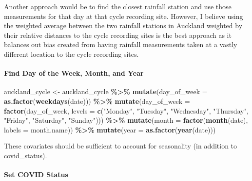 \documentclass[
]{article}
\newenvironment{Shaded}{\begin{snugshade}}{\end{snugshade}}
\newcommand{\AttributeTok}[1]{\textcolor[rgb]{0.13,0.29,0.53}{#1}}
\newcommand{\FunctionTok}[1]{\textcolor[rgb]{0.13,0.29,0.53}{\textbf{#1}}}
\newcommand{\NormalTok}[1]{#1}
\newcommand{\OtherTok}[1]{\textcolor[rgb]{0.56,0.35,0.01}{#1}}
\newcommand{\SpecialCharTok}[1]{\textcolor[rgb]{0.81,0.36,0.00}{\textbf{#1}}}
\newcommand{\StringTok}[1]{\textcolor[rgb]{0.31,0.60,0.02}{#1}}
\begin{document}
Another approach would be to find the closest rainfall station and use
those measurements for that day at that cycle recording site. However, I
believe using the weighted average between the two rainfall stations in
Auckland weighted by their relative distances to the cycle recording
sites is the best approach as it balances out bias created from having
rainfall measurements taken at a vastly different location to the cycle
recording sites.

\hypertarget{find-day-of-the-week-month-and-year}{%
\paragraph{Find Day of the Week, Month, and
Year}\label{find-day-of-the-week-month-and-year}}

\begin{Shaded}
\begin{Highlighting}[]
\NormalTok{auckland\_cycle }\OtherTok{\textless{}{-}}\NormalTok{ auckland\_cycle }\SpecialCharTok{\%\textgreater{}\%}
  \FunctionTok{mutate}\NormalTok{(}\AttributeTok{day\_of\_week =} \FunctionTok{as.factor}\NormalTok{(}\FunctionTok{weekdays}\NormalTok{(date))) }\SpecialCharTok{\%\textgreater{}\%}
  \FunctionTok{mutate}\NormalTok{(}\AttributeTok{day\_of\_week =} \FunctionTok{factor}\NormalTok{(day\_of\_week, }
                              \AttributeTok{levels =} \FunctionTok{c}\NormalTok{(}\StringTok{"Monday"}\NormalTok{, }\StringTok{"Tuesday"}\NormalTok{, }\StringTok{"Wednesday"}\NormalTok{, }\StringTok{"Thursday"}\NormalTok{, }\StringTok{"Friday"}\NormalTok{, }\StringTok{"Saturday"}\NormalTok{, }\StringTok{"Sunday"}\NormalTok{))) }\SpecialCharTok{\%\textgreater{}\%}
  \FunctionTok{mutate}\NormalTok{(}\AttributeTok{month =} \FunctionTok{factor}\NormalTok{(}\FunctionTok{month}\NormalTok{(date), }\AttributeTok{labels =}\NormalTok{ month.name)) }\SpecialCharTok{\%\textgreater{}\%}
  \FunctionTok{mutate}\NormalTok{(}\AttributeTok{year =} \FunctionTok{as.factor}\NormalTok{(}\FunctionTok{year}\NormalTok{(date)))}
\end{Highlighting}
\end{Shaded}

These covariates should be sufficient to account for seasonality (in
addition to covid\_status).

\hypertarget{set-covid-status}{%
\paragraph{Set COVID Status}\label{set-covid-status}}
\end{document}
